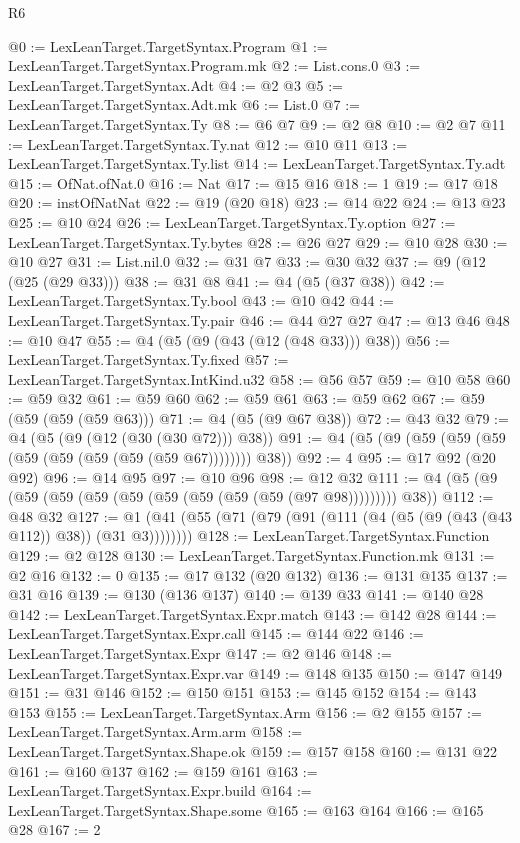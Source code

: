 \begin{lexlean}{R6}
\begin{coremodule}
@0 := LexLeanTarget.TargetSyntax.Program
@1 := LexLeanTarget.TargetSyntax.Program.mk
@2 := List.cons.{0}
@3 := LexLeanTarget.TargetSyntax.Adt
@4 := @2 @3
@5 := LexLeanTarget.TargetSyntax.Adt.mk
@6 := List.{0}
@7 := LexLeanTarget.TargetSyntax.Ty
@8 := @6 @7
@9 := @2 @8
@10 := @2 @7
@11 := LexLeanTarget.TargetSyntax.Ty.nat
@12 := @10 @11
@13 := LexLeanTarget.TargetSyntax.Ty.list
@14 := LexLeanTarget.TargetSyntax.Ty.adt
@15 := OfNat.ofNat.{0}
@16 := Nat
@17 := @15 @16
@18 := 1
@19 := @17 @18
@20 := instOfNatNat
@22 := @19 (@20 @18)
@23 := @14 @22
@24 := @13 @23
@25 := @10 @24
@26 := LexLeanTarget.TargetSyntax.Ty.option
@27 := LexLeanTarget.TargetSyntax.Ty.bytes
@28 := @26 @27
@29 := @10 @28
@30 := @10 @27
@31 := List.nil.{0}
@32 := @31 @7
@33 := @30 @32
@37 := @9 (@12 (@25 (@29 @33)))
@38 := @31 @8
@41 := @4 (@5 (@37 @38))
@42 := LexLeanTarget.TargetSyntax.Ty.bool
@43 := @10 @42
@44 := LexLeanTarget.TargetSyntax.Ty.pair
@46 := @44 @27 @27
@47 := @13 @46
@48 := @10 @47
@55 := @4 (@5 (@9 (@43 (@12 (@48 @33))) @38))
@56 := LexLeanTarget.TargetSyntax.Ty.fixed
@57 := LexLeanTarget.TargetSyntax.IntKind.u32
@58 := @56 @57
@59 := @10 @58
@60 := @59 @32
@61 := @59 @60
@62 := @59 @61
@63 := @59 @62
@67 := @59 (@59 (@59 (@59 @63)))
@71 := @4 (@5 (@9 @67 @38))
@72 := @43 @32
@79 := @4 (@5 (@9 (@12 (@30 (@30 @72))) @38))
@91 := @4 (@5 (@9 (@59 (@59 (@59 (@59 (@59 (@59 (@59 (@59 @67)))))))) @38))
@92 := 4
@95 := @17 @92 (@20 @92)
@96 := @14 @95
@97 := @10 @96
@98 := @12 @32
@111 := @4 (@5 (@9 (@59 (@59 (@59 (@59 (@59 (@59 (@59 (@59 (@97 @98))))))))) @38))
@112 := @48 @32
@127 := @1 (@41 (@55 (@71 (@79 (@91 (@111 (@4 (@5 (@9 (@43 (@43 @112)) @38)) (@31 @3))))))))
@128 := LexLeanTarget.TargetSyntax.Function
@129 := @2 @128
@130 := LexLeanTarget.TargetSyntax.Function.mk
@131 := @2 @16
@132 := 0
@135 := @17 @132 (@20 @132)
@136 := @131 @135
@137 := @31 @16
@139 := @130 (@136 @137)
@140 := @139 @33
@141 := @140 @28
@142 := LexLeanTarget.TargetSyntax.Expr.match
@143 := @142 @28
@144 := LexLeanTarget.TargetSyntax.Expr.call
@145 := @144 @22
@146 := LexLeanTarget.TargetSyntax.Expr
@147 := @2 @146
@148 := LexLeanTarget.TargetSyntax.Expr.var
@149 := @148 @135
@150 := @147 @149
@151 := @31 @146
@152 := @150 @151
@153 := @145 @152
@154 := @143 @153
@155 := LexLeanTarget.TargetSyntax.Arm
@156 := @2 @155
@157 := LexLeanTarget.TargetSyntax.Arm.arm
@158 := LexLeanTarget.TargetSyntax.Shape.ok
@159 := @157 @158
@160 := @131 @22
@161 := @160 @137
@162 := @159 @161
@163 := LexLeanTarget.TargetSyntax.Expr.build
@164 := LexLeanTarget.TargetSyntax.Shape.some
@165 := @163 @164
@166 := @165 @28
@167 := 2

\end{coremodule}
\end{lexlean}
